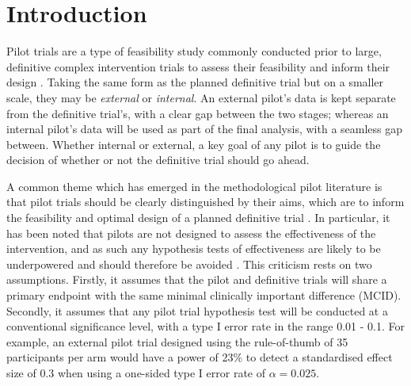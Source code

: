 \documentclass[sagev, Crown]{sagej}
\begin{document}
\maketitle

\section{Introduction}

Pilot trials are a type of feasibility study \cite{Eldridge2016} commonly conducted prior to large, definitive complex intervention trials to assess their feasibility and inform their design \cite{Craig2008}. Taking the same form as the planned definitive trial but on a smaller scale, they may be \emph{external} or \emph{internal}. An external pilot's data is kept separate from the definitive trial's, with a clear gap between the two stages; whereas an internal pilot's data will be used as part of the final analysis, with a seamless gap between. Whether internal or external, a key goal of any pilot is to guide the decision of whether or not the definitive trial should go ahead.

A common theme which has emerged in the methodological pilot literature is that pilot trials should be clearly distinguished by their aims, which are to inform the feasibility and optimal design of a planned definitive trial \cite{Lancaster2004, Arain2010, Thabane2010, Eldridge2016, Eldridge2016a}. In particular, it has been noted that pilots are not designed to assess the effectiveness of the intervention, and as such any hypothesis tests of effectiveness are likely to be underpowered and should therefore be avoided \cite{Wilson2015}. This criticism rests on two assumptions. Firstly, it assumes that the pilot and definitive trials will share a primary endpoint with the same minimal clinically important difference (MCID). Secondly, it assumes that any pilot trial hypothesis test will be conducted at a conventional significance level, with a type I error rate in the range 0.01 - 0.1. For example, an external pilot trial designed using the rule-of-thumb of 35 participants per arm \cite{Teare2014} would have a power of 23\% to detect a standardised effect size of 0.3 when using a one-sided type I error rate of $\alpha = 0.025$.
\end{document}

